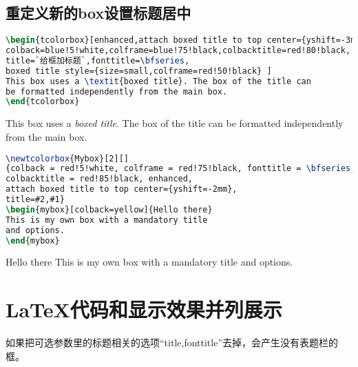 \documentclass{ctexart}
\begin{document}
\subsection{重定义新的box设置标题居中}
\begin{lstlisting}[language={TeX}]
\begin{tcolorbox}[enhanced,attach boxed title to top center={yshift=-3mm,yshifttext=-1mm},
colback=blue!5!white,colframe=blue!75!black,colbacktitle=red!80!black,
title=`给框加标题`,fonttitle=\bfseries,
boxed title style={size=small,colframe=red!50!black} ]
This box uses a \textit{boxed title}. The box of the title can
be formatted independently from the main box.
\end{tcolorbox}
\end{lstlisting}
\begin{tcolorbox}[enhanced,attach boxed title to top center={yshift=-3mm,yshifttext=-1mm},
	colback=blue!5!white,colframe=blue!75!black,colbacktitle=red!80!black,
	title=给框加标题,fonttitle=\bfseries,
	boxed title style={size=small,colframe=red!50!black} ]
	This box uses a \textit{boxed title}. The box of the title can
	be formatted independently from the main box.
\end{tcolorbox}
\begin{lstlisting}[language={TeX}]
\newtcolorbox{Mybox}[2][]
{colback = red!5!white, colframe = red!75!black, fonttitle = \bfseries,
colbacktitle = red!85!black, enhanced,
attach boxed title to top center={yshift=-2mm},
title=#2,#1}
\begin{mybox}[colback=yellow]{Hello there}
This is my own box with a mandatory title
and options.
\end{mybox}
\end{lstlisting}
\begin{Mybox}[colback=yellow]{Hello there}
	This is my own box with a mandatory title
	and options.
\end{Mybox}
\section{LaTeX代码和显示效果并列展示}
如果把可选参数里的标题相关的选项``title,fonttitle''去掉，会产生没有表题栏的框。
\end{document}
